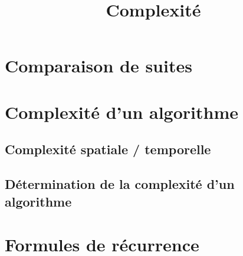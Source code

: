 \documentclass{scrartcl}
\title{Complexité}
\author{}
\date{}
\begin{document}
	\maketitle
	\section{Comparaison de suites}
	\section{Complexité d'un algorithme}
		\subsection{Complexité spatiale / temporelle}
		\subsection{Détermination de la complexité d'un algorithme}
	\section{Formules de récurrence}	
\end{document}
